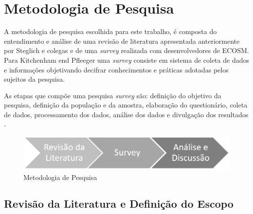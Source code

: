 \chapter{\label{chap:intro}Metodologia de Pesquisa}


A metodologia de pesquisa escolhida para este trabalho, é composta do entendimento e análise de uma revisão de literatura apresentada anteriormente por Steglich e colegas \cite{caio2019} e de uma \textit{survey} realizada com desenvolvedores de ECOSM. Para Kitchenham end Pfleeger \cite{pfleeger2001principles} uma \textit{survey} consiste em sistema de coleta de dados e informações objetivando decifrar conhecimentos e práticas adotadas pelos sujeitos da pesquisa.
   
As etapas que compõe uma pesquisa \textit{survey} são:  definição do objetivo da pesquisa, definição da população e da amostra, elaboração do questionário, coleta de dados, processamento dos dados, análise dos dados e divulgação dos resultados \cite{vieira2010dicionario}.

\begin{figure}
    \centering
    \includegraphics[scale=0.66]{fig/metodologia.PNG}
    \caption{Metodologia de Pesquisa}
    \label{fig:my_label}
\end{figure}


\section{\textbf{Revisão da Literatura e Definição do Escopo}}


